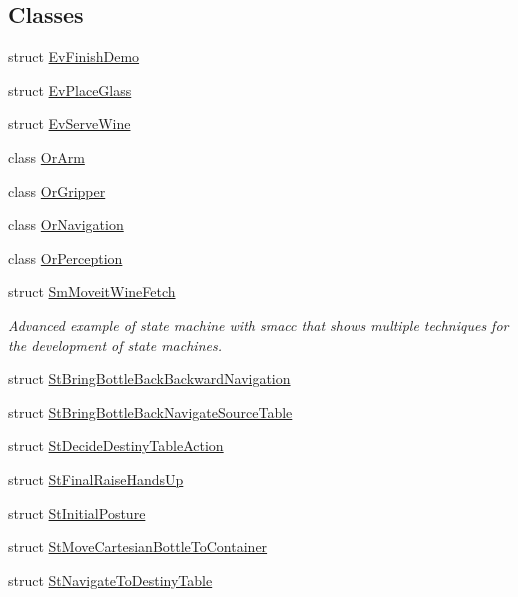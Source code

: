 \subsection*{Classes}
\begin{DoxyCompactItemize}
\item 
struct \hyperlink{structsm__moveit__wine__serve_1_1EvFinishDemo}{Ev\+Finish\+Demo}
\item 
struct \hyperlink{structsm__moveit__wine__serve_1_1EvPlaceGlass}{Ev\+Place\+Glass}
\item 
struct \hyperlink{structsm__moveit__wine__serve_1_1EvServeWine}{Ev\+Serve\+Wine}
\item 
class \hyperlink{classsm__moveit__wine__serve_1_1OrArm}{Or\+Arm}
\item 
class \hyperlink{classsm__moveit__wine__serve_1_1OrGripper}{Or\+Gripper}
\item 
class \hyperlink{classsm__moveit__wine__serve_1_1OrNavigation}{Or\+Navigation}
\item 
class \hyperlink{classsm__moveit__wine__serve_1_1OrPerception}{Or\+Perception}
\item 
struct \hyperlink{structsm__moveit__wine__serve_1_1SmMoveitWineFetch}{Sm\+Moveit\+Wine\+Fetch}
\begin{DoxyCompactList}\small\item\em Advanced example of state machine with smacc that shows multiple techniques for the development of state machines. \end{DoxyCompactList}\item 
struct \hyperlink{structsm__moveit__wine__serve_1_1StBringBottleBackBackwardNavigation}{St\+Bring\+Bottle\+Back\+Backward\+Navigation}
\item 
struct \hyperlink{structsm__moveit__wine__serve_1_1StBringBottleBackNavigateSourceTable}{St\+Bring\+Bottle\+Back\+Navigate\+Source\+Table}
\item 
struct \hyperlink{structsm__moveit__wine__serve_1_1StDecideDestinyTableAction}{St\+Decide\+Destiny\+Table\+Action}
\item 
struct \hyperlink{structsm__moveit__wine__serve_1_1StFinalRaiseHandsUp}{St\+Final\+Raise\+Hands\+Up}
\item 
struct \hyperlink{structsm__moveit__wine__serve_1_1StInitialPosture}{St\+Initial\+Posture}
\item 
struct \hyperlink{structsm__moveit__wine__serve_1_1StMoveCartesianBottleToContainer}{St\+Move\+Cartesian\+Bottle\+To\+Container}
\item 
struct \hyperlink{structsm__moveit__wine__serve_1_1StNavigateToDestinyTable}{St\+Navigate\+To\+Destiny\+Table}

\end{DoxyCompactItemize}
